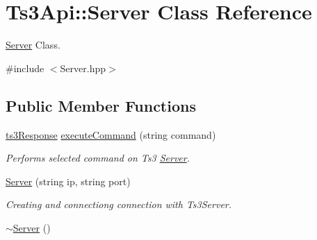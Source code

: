 \hypertarget{class_ts3_api_1_1_server}{}\section{Ts3\+Api\+:\+:Server Class Reference}
\label{class_ts3_api_1_1_server}


\hyperlink{class_ts3_api_1_1_server}{Server} Class.  




{\ttfamily \#include $<$Server.\+hpp$>$}

\subsection*{Public Member Functions}
\begin{DoxyCompactItemize}
\item 
\hyperlink{struct_ts3_api_1_1ts3_response}{ts3\+Response} \hyperlink{class_ts3_api_1_1_server_a3ea16dc4a1a611c444c17b0be04d4f45}{execute\+Command} (string command)
\begin{DoxyCompactList}\small\item\em Performs selected command on Ts3 \hyperlink{class_ts3_api_1_1_server}{Server}. \end{DoxyCompactList}\item 
\hyperlink{class_ts3_api_1_1_server_a58ee97b7e2b067978cbcdb8a594687f2}{Server} (string ip, string port)
\begin{DoxyCompactList}\small\item\em Creating and connectiong connection with Ts3\+Server. \end{DoxyCompactList}\item 
\hyperlink{class_ts3_api_1_1_server_a4b3aa2579cb1c8cd1d069582c14d0fa6}{$\sim$\+Server} ()\hypertarget{class_ts3_api_1_1_server_a4b3aa2579cb1c8cd1d069582c14d0fa6}{}\label{class_ts3_api_1_1_server_a4b3aa2579cb1c8cd1d069582c14d0fa6}


\end{DoxyCompactItemize}
